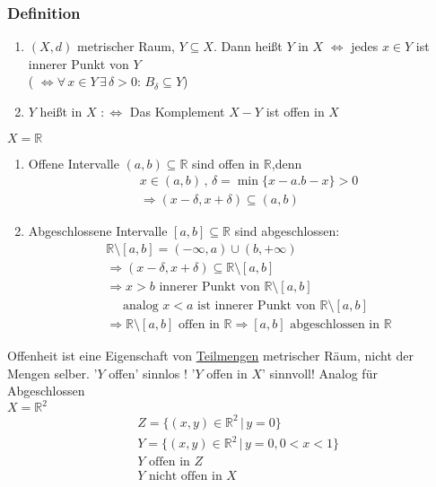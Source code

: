 \subsubsection[Offen, Abgeschlossen]{Definition} %
\label{ssub:definition}
\begin{enumerate}
	\item $(X,d)$ metrischer Raum, $Y \subseteq X$. Dann heißt $Y$  in $X$ $\Leftrightarrow $ jedes $x \in Y$ ist innerer Punkt von $Y$ \\
	( $\Leftrightarrow \forall\, x \in Y \, \exists \, \delta >0: \, B_{\delta } \subseteq Y$)
	\item $Y$ heißt  in $X$ $:\Leftrightarrow $ Das Komplement $X-Y$ ist offen in $X$
\end{enumerate}
 $X = \mathbb{R}$
 \begin{enumerate}
 	\item Offene Intervalle $(a,b) \subseteq \mathbb{R}$ sind offen in $\mathbb{R}$,denn
  \begin{align*}
  	&x \in (a,b) \,,\, \delta = \min \{ x-a.b-x \} >0 \\
	&\Rightarrow (x-\delta ,x+\delta ) \subseteq (a,b)
  \end{align*}  
  
 \item Abgeschlossene Intervalle $[a,b] \subseteq \mathbb{R}$ sind abgeschlossen: 
 \begin{align*}
 	&\mathbb{R} \setminus [a,b] = (-\infty,a) \cup (b, +\infty) \\
 	&\Rightarrow (x-\delta ,x+\delta ) \subseteq \mathbb{R} \setminus [a,b] \\
	&\Rightarrow x>b \text{ innerer Punkt von } \mathbb{R} \setminus[a,b] \\
	&\quad \text{ analog } x<a \text{ ist innerer Punkt von } \mathbb{R}\setminus[a,b] \\
	&\Rightarrow \mathbb{R}\setminus[a,b] \text{ offen in } \mathbb{R} \Rightarrow  [a,b] \text{ abgeschlossen in } \mathbb{R} 
\end{align*}
\end{enumerate}

Offenheit ist eine Eigenschaft von \underline{Teilmengen} metrischer Räum, nicht der Mengen selber. '$Y$ offen' sinnlos ! '$Y$ offen in $X$' sinnvoll! Analog für Abgeschlossen 
 \\
$X = \mathbb{R}^2$ \\
\begin{align*}
	&Z = \{ (x,y) \in \mathbb{R}^2\, |\, y=0 \} \\
	&Y = \{ (x,y) \in \mathbb{R}^2 \, | \, y=0,0<x<1 \} \\
	&Y \text{ offen in } Z \\
	&Y \text{ nicht offen in } X \\
	\end{align*}
